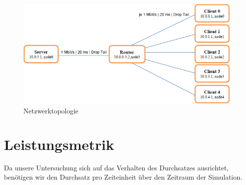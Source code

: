 \documentclass[a4paper, 12pt]{scrartcl}
\begin{document}
\begin{figure}[!htbp]
    \includegraphics{Unbenannt.png}
  \caption{Netzwerktopologie}
  \label{Labelname}
\end{figure}


\section{Leistungsmetrik}
Da unsere Untersuchung sich auf das Verhalten des Durchsatzes ausrichtet, benötigen wir den Durchsatz pro Zeiteinheit über den Zeitraum der Simulation. 
\end{document}
